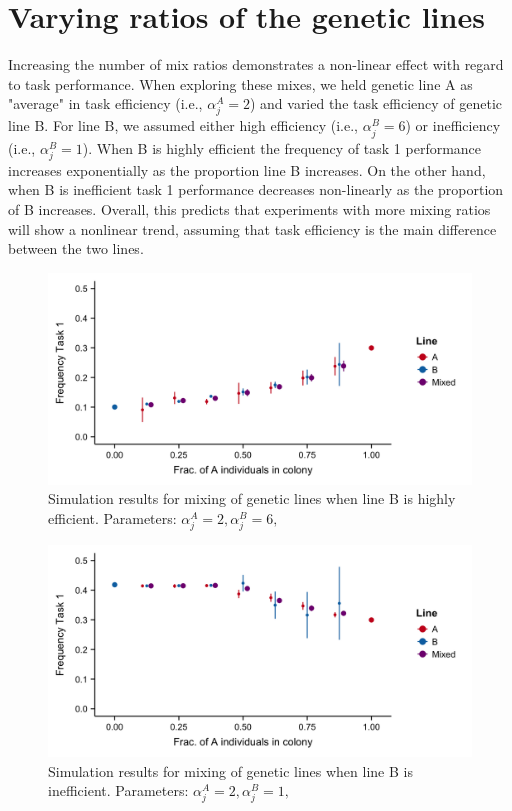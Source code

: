 \documentclass[11pt]{article}
\begin{document}
\newpage
\section{Varying ratios of the genetic lines} \label{sec:varyratios}
Increasing the number of mix ratios demonstrates a non-linear effect with regard to task performance. When exploring these mixes, we held genetic line A as "average" in task efficiency (i.e., $\alpha_j^A = 2$) and varied the task efficiency of genetic line B. For line B, we assumed either high efficiency (i.e., $\alpha_j^B = 6$) or inefficiency (i.e., $\alpha_j^B = 1$). When B is highly efficient the frequency of task 1 performance increases exponentially as the proportion line B increases. On the other hand, when B is inefficient task 1 performance decreases non-linearly as the proportion of B increases. Overall, this predicts that experiments with more mixing ratios will show a nonlinear trend, assuming that task efficiency is the main difference between the two lines. 

\begin{figure}[H]
    \centering
    \includegraphics[trim={0 0.25in 0 0.2in}, clip, width=0.9\linewidth]{./Mix_Alphas_B-super-efficient_Means.png}
    \caption{Simulation results for mixing of genetic lines when line B is highly efficient. Parameters: $\alpha_j^A = 2, \alpha_j^B = 6,$}
    \label{fig:Mix_Alphas_B-efficient}
\end{figure}

\begin{figure}[H]
    \centering
    \includegraphics[trim={0 0.25in 0 0.2in}, clip, width=0.9\linewidth]{Mix_Alphas_B-inefficient_Means.png}
    \caption{Simulation results for mixing of genetic lines when line B is inefficient. Parameters: $\alpha_j^A = 2, \alpha_j^B = 1,$}
    \label{fig:Mix_Alphas_B-inefficient}
\end{figure}
\end{document}
